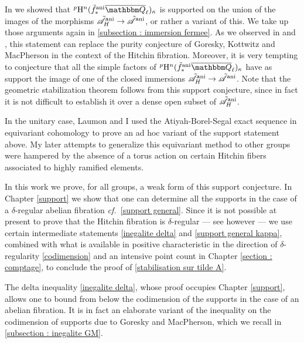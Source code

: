 \documentclass[12pt,english]{smfart}
\numberwithin{equation}{subsection}
\theoremstyle{remark}
\newcommand\calA{{\mathscr A}}
\newcommand\QQ{{\mathbbm Q}}
\newcommand\rmH{{\rm H}}
\newcommand\cf{{\it cf.\ }}
\newcommand\ani{{\rm ani}}
\newcommand\Ql{{\overline\QQ_\ell}}
\begin{document}
In \cite{N} we showed that ${}^p\rmH^n(\tilde f^\ani_*\Ql)_\kappa$ is supported on the union of the images of the morphisms $\tilde\calA^\ani_H\rightarrow\tilde\calA^\ani$, or rather a variant of this. We take up those arguments again in \ref{subsection : immersion fermee}. As we observed in \cite{N} and \cite{LN}, this statement can replace the purity conjecture of Goresky, Kottwitz and MacPherson in the context of the Hitchin fibration. Moreover, it is very tempting to conjecture that all the simple factors of ${}^p\rmH^n(\tilde f^\ani_*\Ql)_\kappa$ have as support the image of one of the closed immersions $\tilde\calA^\ani_H\rightarrow\tilde\calA^\ani$. Note that the geometric stabilization theorem follows from this support conjecture, since in fact it is not difficult to establish it over a dense open subset of $\tilde\calA^\ani_H$.

In the unitary case, Laumon and I used the Atiyah-Borel-Segal exact sequence in equivariant cohomology to prove an ad hoc variant of the support statement above. My later attempts to generalize this equivariant method to other groups were hampered by the absence of a torus action on certain Hitchin fibers associated to highly ramified elements.

In this work we prove, for all groups, a weak form of this support conjecture. In Chapter \ref{support} we show that one can determine all the supports in the case of a $\delta$-regular abelian fibration \cf \ref{support general}. Since it is not possible at present to prove that the Hitchin fibration is $\delta$-regular --- see however \cite[p.~4]{N-preparation} --- we use certain intermediate statements \ref{inegalite delta} and \ref{support general kappa}, combined with what is available in positive characteristic in the direction of $\delta$-regularity \ref{codimension} and an intensive point count in Chapter \ref{section : comptage}, to conclude the proof of \ref{stabilisation sur tilde A}.

The delta inequality \ref{inegalite delta}, whose proof occupies Chapter \ref{support}, allows one to bound from below the codimension of the supports in the case of an abelian fibration. It is in fact an elaborate variant of the inequality on the codimension of supports due to Goresky and MacPherson, which we recall in \ref{subsection : inegalite GM}.
\end{document}
